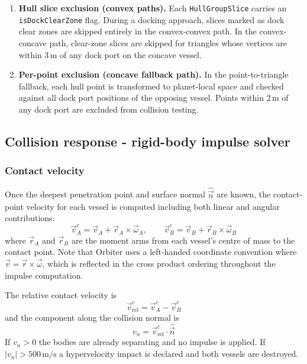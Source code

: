 \documentclass[Orbiter Technical Reference.tex]{subfiles}
\begin{document}
\begin{enumerate}
\item \textbf{Hull slice exclusion (convex paths).}
  Each \texttt{HullGroupSlice} carries an \texttt{isDockClearZone} flag.
  During a docking approach, slices marked as dock clear zones are
  skipped entirely in the convex-convex path.  In the convex-concave
  path, clear-zone slices are skipped for triangles whose vertices are
  within 3\,m of any dock port on the concave vessel.

\item \textbf{Per-point exclusion (concave fallback path).}
  In the point-to-triangle fallback, each hull point is transformed to
  planet-local space and checked against all dock port positions of the
  opposing vessel.  Points within 2\,m of any dock port are excluded
  from collision testing.
\end{enumerate}


\subsection{Collision response - rigid-body impulse solver}
\label{ssec:response}

\subsubsection{Contact velocity}
Once the deepest penetration point and surface normal $\hat{\vec{n}}$
are known, the contact-point velocity for each vessel is computed
including both linear and angular contributions:
\begin{equation}
\vec{v}_A^c = \vec{v}_A + \vec{r}_A \times \vec{\omega}_A, \qquad
\vec{v}_B^c = \vec{v}_B + \vec{r}_B \times \vec{\omega}_B
\label{eq:contact_vel}
\end{equation}
where $\vec{r}_A$ and $\vec{r}_B$ are the moment arms from each vessel's
centre of mass to the contact point.  Note that Orbiter uses a
left-handed coordinate convention where $\vec{v} = \vec{r} \times
\vec{\omega}$, which is reflected in the cross product ordering
throughout the impulse computation.

The relative contact velocity is
\begin{equation*}
\vec{v}_{\mathrm{rel}}^c = \vec{v}_A^c - \vec{v}_B^c
\end{equation*}
and the component along the collision normal is
\begin{equation*}
v_n = \vec{v}_{\mathrm{rel}}^c \cdot \hat{\vec{n}}
\end{equation*}
If $v_n > 0$ the bodies are already separating and no impulse is applied.
If $|v_n| > 500\,\text{m/s}$ a hypervelocity impact is declared and
both vessels are destroyed.
\end{document}
